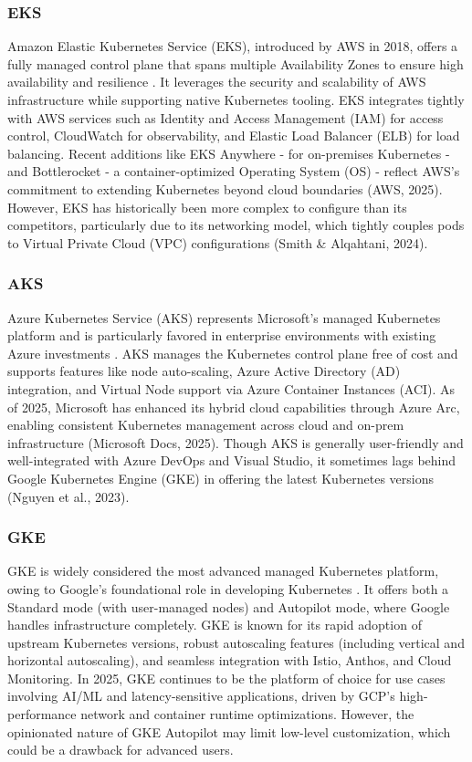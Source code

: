 \subsubsection{EKS}
Amazon Elastic Kubernetes Service (EKS), introduced by AWS in 2018, offers a fully managed control plane that spans multiple Availability Zones to ensure high availability and resilience \cite{aws-docs}. It leverages the security and scalability of AWS infrastructure while supporting native Kubernetes tooling. EKS integrates tightly with AWS services such as Identity and Access Management (IAM) for access control, CloudWatch for observability, and Elastic Load Balancer (ELB) for load balancing. Recent additions like EKS Anywhere - for on-premises Kubernetes - and Bottlerocket - a container-optimized Operating System (OS) - reflect AWS's commitment to extending Kubernetes beyond cloud boundaries (AWS, 2025). However, EKS has historically been more complex to configure than its competitors, particularly due to its networking model, which tightly couples pods to Virtual Private Cloud (VPC) configurations (Smith \& Alqahtani, 2024).

\subsubsection{AKS}
Azure Kubernetes Service (AKS) represents Microsoft's managed Kubernetes platform and is particularly favored in enterprise environments with existing Azure investments \cite{azure-docs}. AKS manages the Kubernetes control plane free of cost and supports features like node auto-scaling, Azure Active Directory (AD) integration, and Virtual Node support via Azure Container Instances (ACI). As of 2025, Microsoft has enhanced its hybrid cloud capabilities through Azure Arc, enabling consistent Kubernetes management across cloud and on-prem infrastructure (Microsoft Docs, 2025). Though AKS is generally user-friendly and well-integrated with Azure DevOps and Visual Studio, it sometimes lags behind Google Kubernetes Engine (GKE) in offering the latest Kubernetes versions (Nguyen et al., 2023).

\subsubsection{GKE}
GKE is widely considered the most advanced managed Kubernetes platform, owing to Google's foundational role in developing Kubernetes \cite{gcp-docs}. It offers both a Standard mode (with user-managed nodes) and Autopilot mode, where Google handles infrastructure completely. GKE is known for its rapid adoption of upstream Kubernetes versions, robust autoscaling features (including vertical and horizontal autoscaling), and seamless integration with Istio, Anthos, and Cloud Monitoring. In 2025, GKE continues to be the platform of choice for use cases involving AI/ML and latency-sensitive applications, driven by GCP's high-performance network and container runtime optimizations. However, the opinionated nature of GKE Autopilot may limit low-level customization, which could be a drawback for advanced users.


